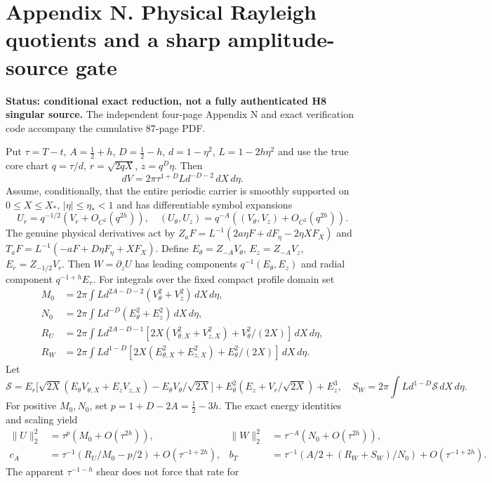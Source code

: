 \clearpage
\section*{Appendix N. Physical Rayleigh quotients and a sharp amplitude-source gate}
\noindent\textbf{Status: conditional exact reduction, not a fully authenticated H8 singular source.}
The independent four-page Appendix N and exact verification code accompany the cumulative 87-page PDF.

Put $\tau=T-t$, $A=\tfrac12+h$, $D=\tfrac12-h$, $d=1-\eta^2$, $L=1-2h\eta^2$ and use the true core chart
$q=\tau/d$, $r=\sqrt{2qX}$, $z=q^D\eta$. Then
\[
\boxed{dV=2\pi\tau^{1+D} Ld^{-D-2}\,dX\,d\eta.}
\]
Assume, conditionally, that the entire periodic carrier is smoothly supported on $0\le X\le X_*$, $|\eta|\le\eta_*<1$ and has differentiable symbol expansions
\[
U_r=q^{-1/2}(V_r+O_{C^2}(q^{2h})),\quad
(U_\theta,U_z)=q^{-A}((V_\theta,V_z)+O_{C^2}(q^{2h})).
\]
The genuine physical derivatives act by
$Z_aF=L^{-1}(2a\eta F+dF_\eta-2\eta XF_X)$ and
$T_aF=L^{-1}(-aF+D\eta F_\eta+XF_X)$.
Define $E_\theta=Z_{-A}V_\theta$, $E_z=Z_{-A}V_z$,
$E_r=Z_{-1/2}V_r$.
Then $W=\partial_zU$ has leading components
$q^{-1}(E_\theta,E_z)$ and radial component $q^{-1+h}E_r$.
For integrals over the fixed compact profile domain set
\begin{align*}
M_0&=2\pi\int Ld^{2A-D-2}(V_\theta^2+V_z^2)\,dX\,d\eta,\\
N_0&=2\pi\int Ld^{-D}(E_\theta^2+E_z^2)\,dX\,d\eta,\\
R_U&=2\pi\int Ld^{2A-D-1}
 [2X(V_{\theta,X}^2+V_{z,X}^2)+V_\theta^2/(2X)]\,dX\,d\eta,\\
R_W&=2\pi\int Ld^{1-D}
 [2X(E_{\theta,X}^2+E_{z,X}^2)+E_\theta^2/(2X)]\,dX\,d\eta .
\end{align*}
Let
\[
\mathcal S=E_r\bigl[\sqrt{2X}(E_\theta V_{\theta,X}+E_z V_{z,X})
-E_\theta V_\theta/\sqrt{2X}\bigr]
+E_\theta^2(E_z+V_r/\sqrt{2X})+E_z^3,\quad
S_W=2\pi\int Ld^{1-D}\mathcal S\,dX\,d\eta.
\]
For positive $M_0,N_0$, set $p=1+D-2A=\frac12-3h$. The exact energy identities and scaling yield
\[
\boxed{\begin{aligned}
\|U\|_2^2&=\tau^p(M_0+O(\tau^{2h})),&
\|W\|_2^2&=\tau^{-A}(N_0+O(\tau^{2h})),\\
c_A&=\tau^{-1}(R_U/M_0-p/2)+O(\tau^{-1+2h}),&
b_T&=\tau^{-1}(A/2+(R_W+S_W)/N_0)+O(\tau^{-1+2h}).
\end{aligned}}
\]
The apparent $\tau^{-1-h}$ shear does not force that rate for
